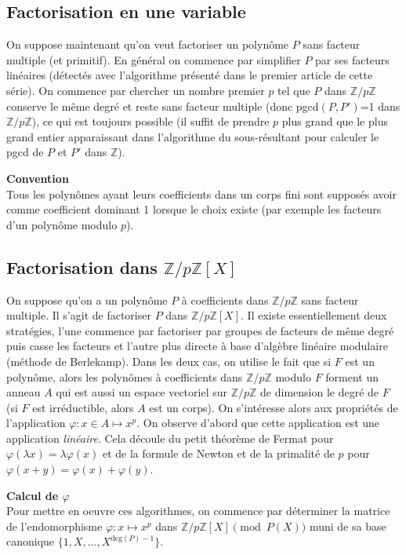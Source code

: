 \documentclass[a4paper,11pt]{book}
\begin{document}
\begin{giacjshere}
\section{Factorisation en une variable}
On suppose maintenant qu'on veut factoriser un polynôme $P$ sans facteur
multiple (et primitif). En général on commence par simplifier $P$ par
ses facteurs linéaires (détectés avec l'algorithme présenté dans le
premier article de cette série). On commence par chercher un nombre premier $p$
tel que $P$ dans $\mathbb{Z}/p\mathbb{Z}$ conserve le même degré et reste sans facteur 
multiple (donc pgcd$(P,P')$=1 dans $\mathbb{Z}/p\mathbb{Z}$), ce qui est toujours
possible (il suffit de prendre $p$ plus grand que le plus grand entier 
apparaissant dans l'algorithme du sous-résultant pour calculer
le pgcd de $P$ et $P'$ dans $\mathbb{Z}$).

{\bf Convention}\\
Tous les polynômes ayant leurs coefficients dans un corps fini sont
supposés avoir comme coefficient dominant 1 lorsque le choix
existe (par exemple les facteurs d'un polynôme modulo $p$).

\subsection{Factorisation dans $\mathbb{Z}/p\mathbb{Z}[X]$}
On suppose qu'on a un polynôme $P$ à coefficients dans $\mathbb{Z}/p\mathbb{Z}$ sans
facteur multiple. Il s'agit de factoriser $P$ dans $\mathbb{Z}/p\mathbb{Z}[X]$.
Il existe essentiellement deux stratégies, l'une commence par factoriser par
groupes de facteurs de même degré puis casse les facteurs et l'autre 
plus directe à base d'algèbre linéaire modulaire (méthode de Berlekamp). 
Dans les deux cas, on utilise le fait que si $F$ est un polynôme, 
alors les polynômes à coefficients dans $\mathbb{Z}/p\mathbb{Z}$
modulo $F$ forment un anneau $A$ qui est aussi un espace vectoriel 
sur $\mathbb{Z}/p\mathbb{Z}$ de dimension le degré de $F$ 
(si $F$ est irréductible, alors $A$ est un corps).
On s'intéresse alors aux propriétés de l'application 
$\varphi: x \in A \mapsto x^p$.
On observe d'abord que cette application est une application {\em linéaire\/}.
Cela découle du petit théorème de Fermat pour $\varphi(\lambda x)=\lambda
\varphi(x)$ et de la formule de Newton et de la primalité de $p$ pour
$\varphi(x+y)=\varphi(x)+\varphi(y)$.

{\bf Calcul de $\varphi$}\\
Pour mettre en oeuvre ces algorithmes, on commence par déterminer la matrice
de l'endomorphisme $\varphi: x \mapsto x^p$ dans $\mathbb{Z}/p\mathbb{Z}[X] \pmod {P(X)}$
muni de sa base canonique $\{ 1, X,...,X^{\mbox{deg}(P)-1} \}$.


\end{giacjshere}
\end{document}

